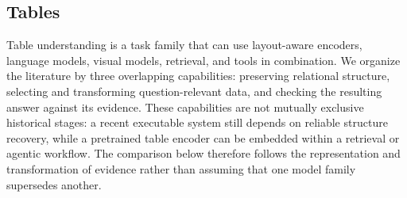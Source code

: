 \subsection{Tables}

Table understanding is a task family that can use layout-aware encoders, language models, visual models, retrieval, and tools in combination. We organize the literature by three overlapping capabilities: preserving relational structure, selecting and transforming question-relevant data, and checking the resulting answer against its evidence. These capabilities are not mutually exclusive historical stages: a recent executable system still depends on reliable structure recovery, while a pretrained table encoder can be embedded within a retrieval or agentic workflow. The comparison below therefore follows the representation and transformation of evidence rather than assuming that one model family supersedes another.

